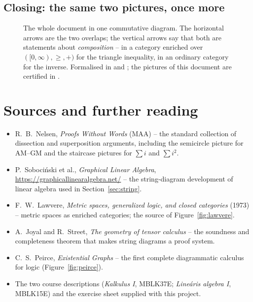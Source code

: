 \subsection{Closing: the same two pictures, once more}

\begin{figure}[H]
\centering
{}
\caption{The whole document in one commutative diagram. The horizontal arrows are the two
overlaps; the vertical arrows say that both are statements about \emph{composition} -- in
a category enriched over $([0,\infty),\ge,+)$ for the triangle inequality, in an ordinary
category for the inverse. Formalised in
 and ;
the pictures of this document are certified in .}
\label{fig:final}
\end{figure}

\section*{Sources and further reading}

\begin{itemize}\itemsep2pt
\item R.\ B.\ Nelsen, \emph{Proofs Without Words} (MAA) -- the standard collection of
  dissection and superposition arguments, including the semicircle picture for AM--GM and
  the staircase pictures for $\sum i$ and $\sum i^{2}$.
\item P.\ Soboci\'nski et al., \emph{Graphical Linear Algebra},
  \url{https://graphicallinearalgebra.net/} -- the string-diagram development of linear
  algebra used in Section~\ref{sec:string}.
\item F.\ W.\ Lawvere, \emph{Metric spaces, generalized logic, and closed categories}
  (1973) -- metric spaces as enriched categories; the source of
  Figure~\ref{fig:lawvere}.
\item A.\ Joyal and R.\ Street, \emph{The geometry of tensor calculus} -- the soundness
  and completeness theorem that makes string diagrams a proof system.
\item C.\ S.\ Peirce, \emph{Existential Graphs} -- the first complete diagrammatic
  calculus for logic (Figure~\ref{fig:peirce}).
\item The two course descriptions (\emph{Kalkulus I}, MBLK37E; \emph{Line\'aris algebra
  I}, MBLK15E) and the exercise sheet  supplied with this
  project.
\end{itemize}
